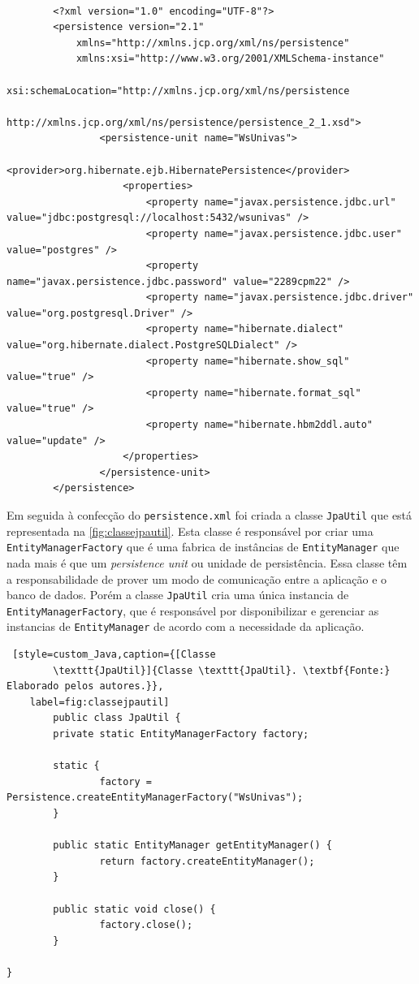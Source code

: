   \begin{lstlisting}[style=custom_XML,caption={[\texttt{persistence.xml}]
  {\texttt{persistence.xml}. \textbf{Fonte:} Elaborado pelos autores.}},
	label=fig:persistence]

		<?xml version="1.0" encoding="UTF-8"?>
		<persistence version="2.1"
			xmlns="http://xmlns.jcp.org/xml/ns/persistence" 
			xmlns:xsi="http://www.w3.org/2001/XMLSchema-instance"
			xsi:schemaLocation="http://xmlns.jcp.org/xml/ns/persistence
			http://xmlns.jcp.org/xml/ns/persistence/persistence_2_1.xsd">
				<persistence-unit name="WsUnivas">
					<provider>org.hibernate.ejb.HibernatePersistence</provider>
					<properties>
						<property name="javax.persistence.jdbc.url" value="jdbc:postgresql://localhost:5432/wsunivas" />
						<property name="javax.persistence.jdbc.user" value="postgres" />
						<property name="javax.persistence.jdbc.password" value="2289cpm22" />
						<property name="javax.persistence.jdbc.driver" value="org.postgresql.Driver" />
						<property name="hibernate.dialect" value="org.hibernate.dialect.PostgreSQLDialect" />
						<property name="hibernate.show_sql" value="true" />
						<property name="hibernate.format_sql" value="true" />
						<property name="hibernate.hbm2ddl.auto" value="update" />
					</properties>
				</persistence-unit>
		</persistence>
	\end{lstlisting}
		
			\par Em seguida à confecção do \texttt{persistence.xml} foi criada a
		classe \texttt{JpaUtil} que está representada na \ref{fig:classejpautil}.
		Esta classe é responsável por criar uma \texttt{EntityManagerFactory} que é
		uma  fabrica de instâncias de \texttt{EntityManager} que nada mais é que um
		\textit{persistence unit} ou unidade de persistência. Essa classe têm a
		responsabilidade de prover um modo de comunicação entre a aplicação e o banco
		de dados. Porém a classe \texttt{JpaUtil} cria uma única instancia de
		\texttt{EntityManagerFactory}, que é responsável por disponibilizar e
		gerenciar as instancias de \texttt{EntityManager} de acordo com a necessidade
		da aplicação.
		
		\pagebreak
		\begin{lstlisting} [style=custom_Java,caption={[Classe
		\texttt{JpaUtil}]{Classe \texttt{JpaUtil}. \textbf{Fonte:} Elaborado pelos autores.}},
	label=fig:classejpautil] 
		public class JpaUtil {
        private static EntityManagerFactory factory;

        static {
                factory = Persistence.createEntityManagerFactory("WsUnivas");
        }

        public static EntityManager getEntityManager() {
                return factory.createEntityManager();
        }

        public static void close() {
                factory.close();
        }

}
	\end{lstlisting} 



